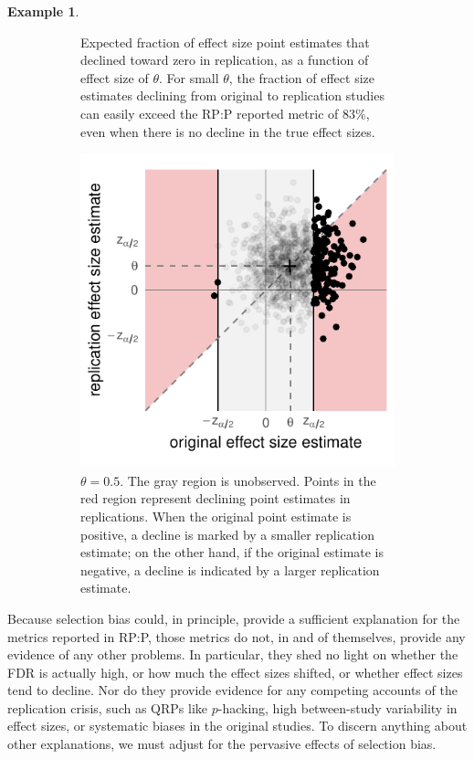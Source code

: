 \documentclass[aoas, preprint]{imsart}
\theoremstyle{definition}
\newtheorem{example}{Example}
\theoremstyle{custom}
\begin{document}
\begin{example}
\begin{figure}[htbp]
\begin{subfigure}[t]{0.59\hsize}
	      \caption{Expected fraction of effect size point estimates that declined toward zero in replication, as a function of effect size of $\theta$. For small $\theta$, the fraction of effect size estimates declining from original to replication studies can easily exceed the RP:P reported metric of $83\%$, even when there is no decline in the true effect sizes.}
	    \label{fig:naive-decline-func}
	    \end{subfigure}
	    \hfill
	    \begin{subfigure}[t]{0.39\hsize}
	      \centering
	      \includegraphics[width=\hsize]{naive-decline-theta1}
	      \caption{$\theta = 0.5$. The gray region is unobserved. Points in the red region represent declining point estimates in replications. When the original point estimate is positive, a decline is marked by a smaller replication estimate; on the other hand, if the original estimate is negative, a decline is indicated by a larger replication estimate.}
	    \label{fig:naive-ci-theta03}
	    \end{subfigure}
	    \caption{}
	  \label{fig:naive-decline}
	  \end{figure}
  \end{example}

  Because selection bias could, in principle, provide a sufficient explanation for the metrics reported in RP:P, those metrics do not, in and of themselves, provide any evidence of any other problems. In particular, they shed no light on whether the FDR is actually high, or how much the effect sizes shifted, or whether effect sizes tend to decline. Nor do they provide evidence for any competing accounts of the replication crisis, such as QRPs like $p$-hacking, high between-study variability in effect sizes, or systematic biases in the original studies. To discern anything about other explanations, we must adjust for the pervasive effects of selection bias.
\end{document}
